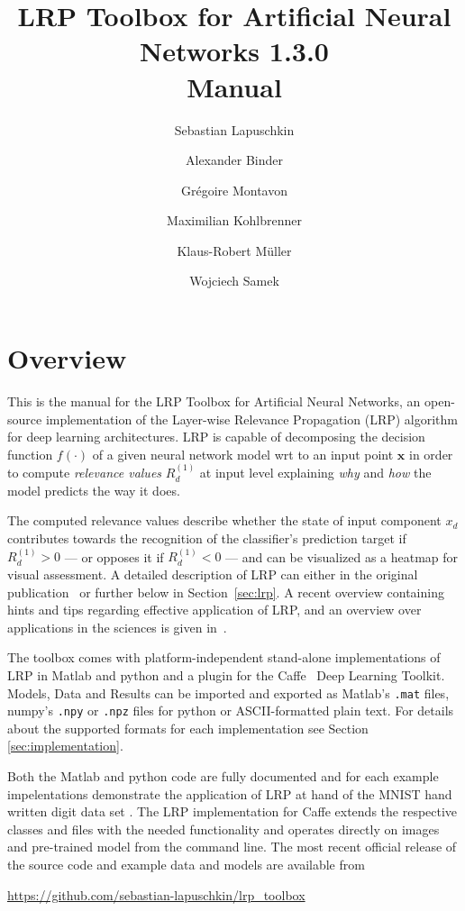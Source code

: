\documentclass[a4wide]{article}
\newcommand{\x}{\boldsymbol{x}}
\begin{document}
\title{LRP Toolbox for Artificial Neural Networks 1.3.0 \\ Manual}

\author{Sebastian Lapuschkin \and Alexander Binder \and Gr\'egoire Montavon \and Maximilian Kohlbrenner \and Klaus-Robert M\"uller \and Wojciech Samek}

\maketitle

\tableofcontents

\newpage

\section{Overview}
This is the manual for the LRP Toolbox for Artificial Neural Networks,
an open-source implementation of the Layer-wise Relevance Propagation (LRP)\cite{bach15}
algorithm for deep learning architectures.
LRP is capable of decomposing the decision function $f(\cdot)$ of a given neural network model wrt to an input point $\x$ in order to compute \emph{relevance values} $R^{(1)}_d$ at input level explaining \emph{why} and \emph{how} the model predicts the way it does.

The computed relevance values describe whether the state of input component $x_d$ contributes towards the recognition of the classifier's prediction target if $R^{(1)}_d > 0$ --- or opposes it if $R^{(1)}_d < 0$ --- and can be visualized as a heatmap for visual assessment.
A detailed description of LRP can either in the original publication~\cite{bach15} or further below in Section~\ref{sec:lrp}.
A recent overview containing hints and tips regarding effective application of LRP, and an overview over applications in the sciences is given in~\cite{samek2020toward}.

The toolbox comes with platform-independent stand-alone implementations of LRP in Matlab and python and a plugin for the Caffe~\cite{jia2014caffe} Deep Learning Toolkit.
Models, Data and Results can be imported and exported as Matlab's \texttt{.mat} files, numpy's \texttt{.npy} or \texttt{.npz} files for python or ASCII-formatted plain text. For details about the supported formats for each implementation see Section \ref{sec:implementation}.

Both the Matlab and python code are fully documented and for each example impelentations demonstrate the application of LRP at hand of the MNIST hand written digit data set \cite{lecun1998mnist}.
The LRP implementation for Caffe extends the respective classes and files with the needed functionality and operates directly on images and pre-trained model from the command line.
The most recent official release of the source code and example data and models are available from
\begin{center}
\url{https://github.com/sebastian-lapuschkin/lrp_toolbox}
\end{center}
\end{document}
